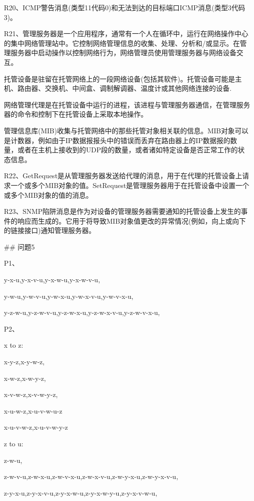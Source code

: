 \documentclass[11pt,UTF8,twoside]{article}
\begin{document}
	R20、ICMP警告消息(类型11代码0)和无法到达的目标端口ICMP消息(类型3代码3)。
	
	R21、管理服务器是一个应用程序，通常有一个人在循环中，运行在网络操作中心的集中网络管理站中。它控制网络管理信息的收集、处理、分析和/或显示。在管理服务器中启动操作以控制网络行为，网络管理员使用管理服务器与网络设备交互。
	
	托管设备是驻留在托管网络上的一段网络设备(包括其软件)。托管设备可能是主机、路由器、交换机、中间盒、调制解调器、温度计或其他网络连接的设备.
	
	网络管理代理是在托管设备中运行的进程，该进程与管理服务器通信，在管理服务器的命令和控制下在托管设备上采取本地操作。
	
	管理信息库(MIB)收集与托管网络中的那些托管对象相关联的信息。MIB对象可以是计数器，例如由于IP数据报报头中的错误而丢弃在路由器上的IP数据报的数量，或者在主机上接收到的UDP段的数量，或者诸如特定设备是否正常工作的状态信息。
	
	R22、GetRequest是从管理服务器发送给代理的消息，用于在代理的托管设备上请求一个或多个MIB对象的值。SetRequest是管理服务器用于在托管设备中设置一个或多个MIB对象的值的消息。
	
	R23、SNMP陷阱消息是作为对设备的管理服务器需要通知的托管设备上发生的事件的响应而生成的。它用于将导致MIB对象值更改的异常情况(例如，向上或向下的链接接口)通知管理服务器。
	
		\newpage
	\pagestyle{fancy}
	\fancyhf{}  %
	\pagestyle{fancy}
	
	## 问题5
	
	P1、
	
	y-x-u,y-x-v-u,y-x-w-u,y-x-w-v-u,
	
	y-w-u,y-w-v-u,y-w-x-u,y-w-x-v-u,y-w-v-x-u,
	
	y-z-w-u,y-z-w-v-u,y-z-w-x-u,y-z-w-x-v-u,y-z-w-v-x-u,
	
	P2、
	
	x to z:
	
	x-y-z,x-y-w-z,
	
	x-w-z,x-w-y-z,
	
	x-v-w-z,x-v-w-y-z,
	
	x-u-w-z,x-u-v-w-u-z
	
	x-u-v-w-z,x-u-v-w-y-z
	
	z to u:
	
	z-w-u,
	
	z-w-v-u,z-w-x-u,z-w-v-x-u,z-w-x-v-u,z-w-y-x-u,z-w-y-x-v-u,
	
	z-y-x-u,z-y-x-v-u,z-y-x-w-u,z-y-x-w-y-u,z-y-x-v-w-u,
	
\end{document}

